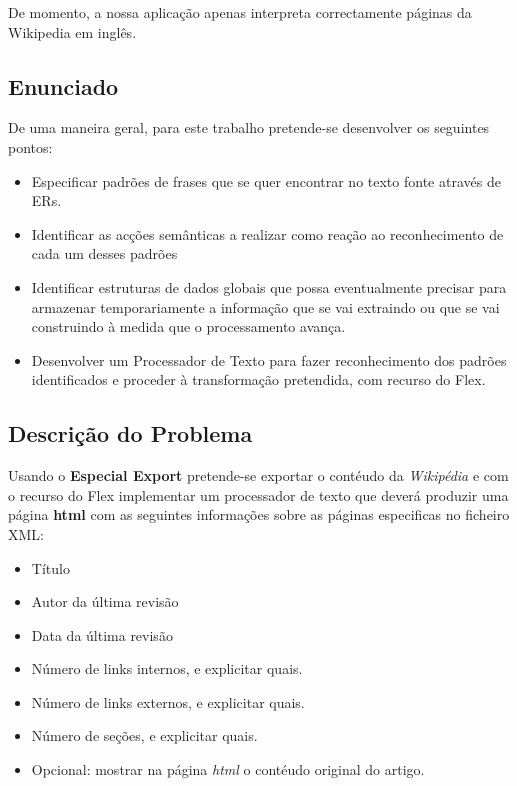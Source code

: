 \documentclass[11pt, a4paper, oneside]{article}
\begin{document}
De momento, a nossa aplicação apenas interpreta correctamente páginas da Wikipedia em inglês.
\newpage

\subsection{Enunciado}

De uma maneira geral, para este trabalho pretende-se desenvolver os seguintes pontos:
\begin{itemize}
\item Especificar padrões de frases que se quer encontrar no texto fonte através de ERs.
\item Identificar as acções semânticas a realizar como reação ao reconhecimento de cada um desses padrões
\item Identificar estruturas de dados globais que possa eventualmente precisar para armazenar temporariamente a informação que se vai extraindo ou que se vai construindo à medida que o processamento avança.
\item Desenvolver um Processador de Texto para fazer reconhecimento dos padrões identificados e proceder à transformação pretendida, com recurso do Flex.
\end{itemize}

\subsection{Descrição do Problema}

Usando o \textbf{Especial Export} pretende-se exportar o contéudo da \textit{Wikipédia} e com o recurso do Flex implementar um processador de texto que deverá produzir uma página \textbf{html} com as seguintes informações sobre as páginas especificas no ficheiro XML:

\begin{itemize}
\item Título
\item Autor da última revisão
\item Data da última revisão
\item Número de links internos, e explicitar quais.
\item Número de links externos, e explicitar quais.
\item Número de seções, e explicitar quais.
\item Opcional: mostrar na página \textit{html} o contéudo original do artigo.
\end{itemize}

\newpage
\end{document}
